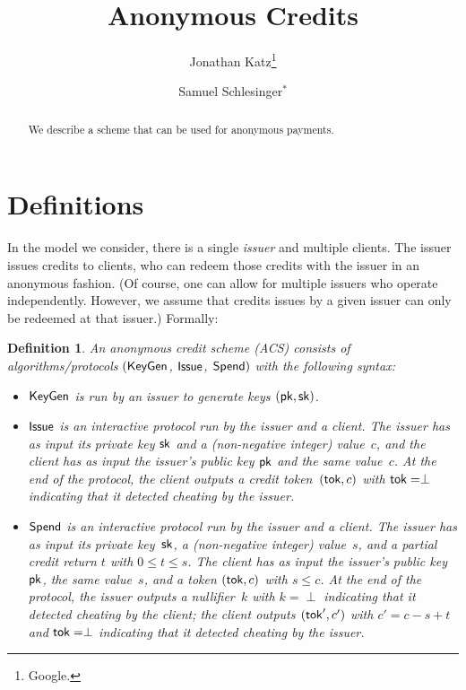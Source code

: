 \documentclass[11pt]{article}
\title{\textbf{Anonymous Credits}}
\author{{\sc Jonathan Katz}\thanks{Google.} \and {\sc Samuel Schlesinger}$^*$}
\date{}
\newtheorem{definition}{Definition}
\def\issue{{\sf Issue}}
\def\keygen{{\sf KeyGen}}
\def\pk{{\sf pk}}
\def\sk{{\sf sk}}
\def\tok{{\sf tok}}
\def\cred{{\tok}}
\def\spend{{\sf Spend}}
\begin{document}
\maketitle

\begin{abstract}
We describe a scheme that can be used for anonymous payments.
\end{abstract}

\section{Definitions}
\label{sec:definitions}
In the model we consider, there is a single \emph{issuer} and multiple {clients}. 
The issuer issues credits to clients, who can redeem those credits with the issuer in an anonymous fashion. 
(Of course, one can allow for multiple issuers who operate independently. 
However, we assume that credits issues by a given issuer can only be redeemed at that issuer.)
Formally:

\begin{definition}\label{def:creds}
An {\sf anonymous credit scheme} (ACS) consists of algorithms/protocols
$(\keygen$, $\issue$, $\spend)$ with the following syntax:
\begin{itemize}
    \item $\keygen$ is run by an issuer to generate keys $(\pk, \sk)$.
    \item $\issue$ is an interactive protocol run by the issuer and a client. The issuer has as input its private key $\sk$ and a (non-negative integer) value~$c$, and the client has as input the issuer's public key $\pk$ and the same value~$c$. At the end of the protocol, the client outputs a credit token~$(\tok, c)$ with  
    $\tok=\perp$ indicating that it detected cheating by the issuer.
    \item $\spend$ is an interactive protocol run by the issuer and a client.
    The issuer has as input its private key~$\sk$, a (non-negative integer) value~$s$, and a partial credit return $t$ with $0 \leq t \leq s$. The client has as input the issuer's public key~$\pk$, the same value~$s$, and a token $(\tok, c)$ with $s \leq c$.
    At the end of the protocol, the issuer outputs a nullifier~$k$ with $k=\perp$ indicating that it detected cheating by the client; the client outputs $(\tok', c')$ with $c' = c - s + t$ and $\tok=\perp$ indicating that it detected cheating by the issuer.
\end{itemize}
\end{definition}
\end{document}
